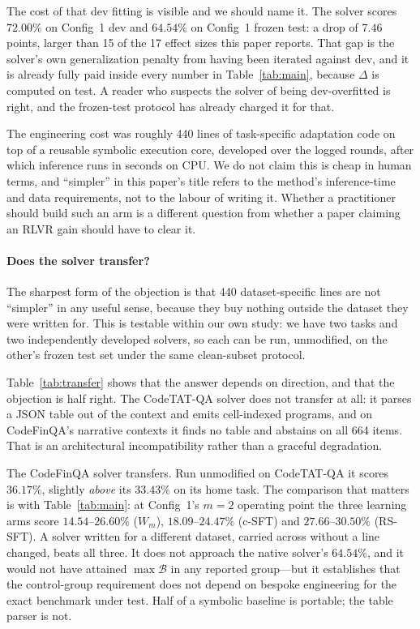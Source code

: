 The cost of that dev fitting is visible and we should name it. The solver scores
$72.00\%$ on Config~1 dev and $64.54\%$ on Config~1 frozen test: a drop of
$7.46$ points, larger than 15 of the 17 effect sizes this paper reports. That
gap is the solver's own generalization penalty from having been iterated
against dev, and it is already fully paid inside every number in
Table~\ref{tab:main}, because $\Delta$ is computed on test. A reader who
suspects the solver of being dev-overfitted is right, and the frozen-test
protocol has already charged it for that.

The engineering cost was roughly 440 lines of task-specific adaptation code on
top of a reusable symbolic execution core, developed over the logged rounds,
after which inference runs in seconds on CPU. We do not claim this is cheap in
human terms, and ``simpler'' in this paper's title refers to the method's
inference-time and data requirements, not to the labour of writing it. Whether
a practitioner should build such an arm is a different question from whether a
paper claiming an RLVR gain should have to clear it.

\paragraph{Does the solver transfer?}
The sharpest form of the objection is that 440 dataset-specific lines are not
``simpler'' in any useful sense, because they buy nothing outside the dataset
they were written for. This is testable within our own study: we have two
tasks and two independently developed solvers, so each can be run, unmodified,
on the other's frozen test set under the same clean-subset protocol.



Table~\ref{tab:transfer} shows that the answer depends on direction, and that
the objection is half right. The CodeTAT-QA solver does not transfer at all: it
parses a JSON table out of the context and emits cell-indexed programs, and on
CodeFinQA's narrative contexts it finds no table and abstains on all 664 items.
That is an architectural incompatibility rather than a graceful degradation.

The CodeFinQA solver transfers. Run unmodified on CodeTAT-QA it scores
$36.17\%$, slightly \emph{above} its $33.43\%$ on its home task. The comparison
that matters is with Table~\ref{tab:main}: at Config~1's $m{=}2$ operating
point the three learning arms score $14.54$--$26.60\%$ ($W_m$),
$18.09$--$24.47\%$ (c-SFT) and $27.66$--$30.50\%$ (RS-SFT). A solver written
for a different dataset, carried across without a line changed, beats all three.
It does not approach the native solver's $64.54\%$, and it would not have
attained $\max\mathcal{B}$ in any reported group---but it establishes that the
control-group requirement does not depend on bespoke engineering for the exact
benchmark under test. Half of a symbolic baseline is portable; the table parser
is not.
